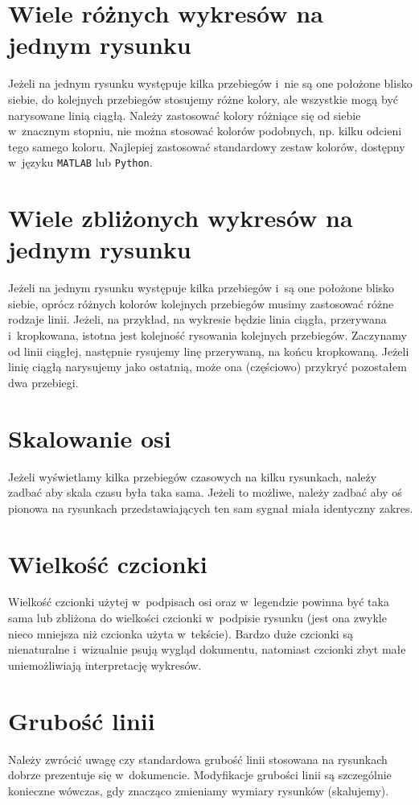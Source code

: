 \section{Wiele różnych wykresów na jednym rysunku}
Jeżeli na jednym rysunku występuje kilka przebiegów i~nie są one położone blisko siebie, do kolejnych przebiegów stosujemy różne kolory, ale wszystkie mogą być narysowane linią ciągłą. Należy zastosować kolory różniące się od siebie w~znacznym stopniu, nie można stosować kolorów podobnych, np. kilku odcieni tego samego koloru. Najlepiej zastosować standardowy zestaw kolorów, dostępny w~języku \texttt{MATLAB} lub \texttt{Python}.

\section{Wiele zbliżonych wykresów na jednym rysunku}
Jeżeli na jednym rysunku występuje kilka przebiegów i~są one położone blisko siebie, oprócz różnych kolorów kolejnych przebiegów musimy zastosować różne rodzaje linii. Jeżeli, na przykład, na wykresie będzie linia ciągła, przerywana i~kropkowana, istotna jest kolejność rysowania kolejnych przebiegów. Zaczynamy od linii ciągłej, następnie rysujemy linę przerywaną, na końcu kropkowaną. Jeżeli linię ciągłą narysujemy jako ostatnią, może ona (częściowo) przykryć pozostałem dwa przebiegi.

\section{Skalowanie osi}
Jeżeli wyświetlamy kilka przebiegów czasowych na kilku rysunkach, należy zadbać aby skala czasu była taka sama. Jeżeli to możliwe, należy zadbać aby oś pionowa na rysunkach przedstawiających ten sam sygnał miała identyczny zakres.

\section{Wielkość czcionki}
Wielkość czcionki użytej w~podpisach osi oraz w~legendzie powinna być taka sama lub zbliżona do wielkości czcionki w~podpisie rysunku (jest ona zwykle nieco mniejsza niż czcionka użyta w~tekście). Bardzo duże czcionki są nienaturalne i~wizualnie psują wygląd dokumentu, natomiast czcionki zbyt małe uniemożliwiają interpretację wykresów.

\section{Grubość linii}
Należy zwrócić uwagę czy standardowa grubość linii stosowana na rysunkach dobrze prezentuje się w~dokumencie. Modyfikacje grubości linii są szczególnie konieczne wówczas, gdy znacząco zmieniamy wymiary rysunków (skalujemy).

